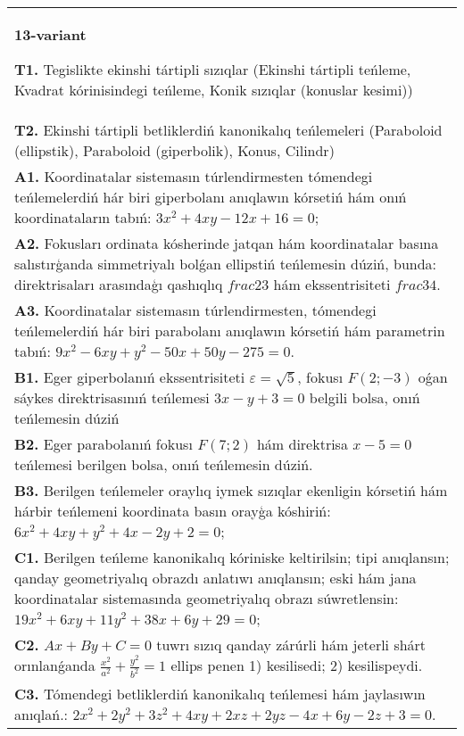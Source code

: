 \documentclass{article}
\begin{document}
\begin{tabular}{m{17cm}}
\textbf{13-variant}
\newline

\textbf{T1.} Tegislikte ekinshi tártipli sızıqlar (Ekinshi tártipli teńleme, Kvadrat kórinisindegi teńleme, Konik sızıqlar (konuslar kesimi)) \\
\textbf{T2.} Ekinshi tártipli betliklerdiń kanonikalıq teńlemeleri (Paraboloid (ellipstik), Paraboloid (giperbolik), Konus, Cilindr) \\
\textbf{A1.} Koordinatalar sistemasın túrlendirmesten tómendegi teńlemelerdiń hár biri giperbolanı anıqlawın kórsetiń hám onıń koordinataların tabıń: $3 x^2+4 x y-12 x+16=0$; \\
\textbf{A2.} Fokusları ordinata kósherinde jatqan hám koordinatalar basına salıstırģanda simmetriyalı bolǵan ellipstiń teńlemesin dúziń, bunda: direktrisaları arasındaģı qashıqlıq $frac{2}{3}$ hám ekssentrisiteti $frac{3}{4}$. \\
\textbf{A3.} Koordinatalar sistemasın túrlendirmesten, tómendegi teńlemelerdiń hár biri parabolanı anıqlawın kórsetiń hám parametrin tabıń: $9 x^2-6 x y+y^2-50 x+50 y-275=0$. \\
\textbf{B1.} Eger giperbolanıń ekssentrisiteti $\varepsilon=\sqrt{5}$, fokusı $F (2;-3) $ oǵan sáykes direktrisasınıń teńlemesi $3 x-y+3=0$ belgili bolsa, onıń teńlemesin dúziń \\
\textbf{B2.} Eger parabolanıń fokusı $F (7; 2) $ hám direktrisa $x-5=0$ teńlemesi berilgen bolsa, onıń teńlemesin dúziń. \\
\textbf{B3.} Berilgen teńlemeler oraylıq iymek sızıqlar ekenligin kórsetiń hám hárbir teńlemeni koordinata basın orayģa kóshiriń: $6 x^2+4 x y+y^2+4 x-2 y+2=0$; \\
\textbf{C1.} Berilgen teńleme kanonikalıq kóriniske keltirilsin; tipi anıqlansın; qanday geometriyalıq obrazdı anlatıwı anıqlansın; eski hám jana koordinatalar sistemasında geometriyalıq obrazı súwretlensin: $19 x^2+6 x y+11 y^2+38 x+6 y+29=0$; \\
\textbf{C2.} $A x+B y+C=0$ tuwrı sızıq qanday zárúrli hám jeterli shárt orınlanǵanda $\frac{x^2}{a^2}+\frac{y^2}{b^2}=1$ ellips penen 1) kesilisedi; 2) kesilispeydi. \\
\textbf{C3.} Tómendegi betliklerdiń kanonikalıq teńlemesi hám jaylasıwın anıqlań.: $2 x^2+2 y^2+3 z^2+4 x y+2 x z+2 y z-4 x+6 y-2 z+3=0$. \\

\end{tabular}
\vspace{1cm}
\end{document}
